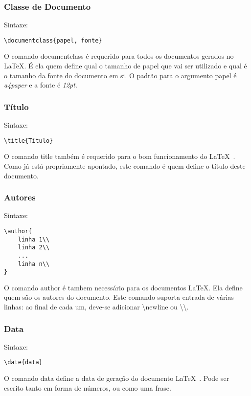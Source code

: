 \documentclass[a4paper,12pt]{article}
\begin{document}
\subsubsection{Classe de Documento}
Sintaxe:
\begin{verbatim}
\documentclass{papel, fonte}
\end{verbatim}

\hspace{2cm}O comando documentclass é requerido para todos os documentos gerados no \LaTeX. É ela quem define qual o tamanho de papel que vai ser utilizado e qual é o tamanho da fonte do documento em si. O padrão para o argumento papel é \textit{a4paper} e a fonte é \textit{12pt}.

\subsubsection{Título}
Sintaxe:
\begin{verbatim}
\title{Título}
\end{verbatim}

\hspace{2cm}O comando title também é requerido para o bom funcionamento do \LaTeX\ . Como já está propriamente apontado, este comando é quem define o título deste documento.

\subsubsection{Autores}
Sintaxe:
\begin{verbatim}
\author{
	linha 1\\
	linha 2\\
	...
	linha n\\
}
\end{verbatim}

\hspace{2cm}O comando author é tambem necessário para os documentos \LaTeX. Ela define quem são os autores do documento.
Este comando suporta entrada de várias linhas: ao final de cada um, deve-se adicionar \textbackslash newline ou \textbackslash \textbackslash .

\subsubsection{Data}
Sintaxe:
\begin{verbatim}
\date{data}
\end{verbatim}

\hspace{2cm}O comando data define a data de geração do documento \LaTeX\ . Pode ser escrito tanto em forma de números, ou como uma frase.
\end{document}
